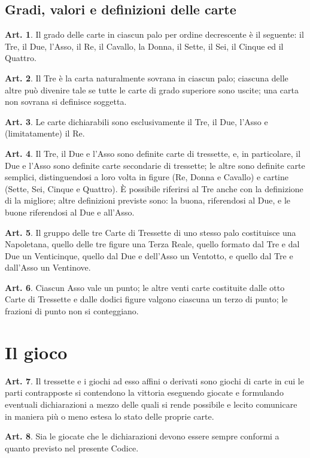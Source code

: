 \documentclass[italian,a4paper]{book}
\theoremstyle{definition}
\newtheorem{art}{Art.}
\begin{document}
\subsection{Gradi, valori e definizioni delle carte}
\begin{art}
    Il grado delle carte in ciascun palo per ordine decrescente è il seguente: il Tre, il Due, l'Asso, il Re, il Cavallo, la Donna, il Sette, il Sei, il Cinque ed il Quattro.
\end{art}
\begin{art}\label{carta.sovrana}
    Il Tre è la carta naturalmente sovrana in ciascun palo; ciascuna delle altre può divenire tale se tutte le carte di grado superiore sono uscite; una carta non sovrana si definisce soggetta. 
\end{art}
\begin{art}
    Le carte dichiarabili sono esclusivamente il Tre, il Due, l'Asso e (limitatamente) il Re.
\end{art}
\begin{art}
    Il Tre, il Due e l'Asso sono definite carte di tressette, e, in particolare, il Due e l'Asso sono definite carte secondarie di tressette; le altre sono definite carte semplici, distinguendosi a loro volta in figure (Re, Donna e Cavallo) e cartine (Sette, Sei, Cinque e Quattro). \`E possibile riferirsi al Tre anche con la definizione di la migliore; altre definizioni previste sono: la buona, riferendosi al Due, e le buone riferendosi al Due e all'Asso.
\end{art}
\begin{art}
    Il gruppo delle tre Carte di Tressette di uno stesso palo costituisce una Napoletana, quello delle tre figure una Terza Reale, quello formato dal Tre e dal Due un Venticinque, quello dal Due e dell'Asso un Ventotto, e quello dal Tre e dall'Asso un Ventinove.
\end{art}
\begin{art}
    Ciascun Asso vale un punto; le altre venti carte costituite dalle otto Carte di Tressette e dalle dodici figure valgono ciascuna un terzo di punto; le frazioni di punto non si conteggiano.
\end{art}
\section{Il gioco}
\begin{art}
    Il tressette e i giochi ad esso affini o derivati sono giochi di carte in cui le parti contrapposte si contendono la vittoria eseguendo giocate e formulando eventuali dichiarazioni a mezzo delle quali si rende possibile e lecito comunicare in maniera più o meno estesa lo stato delle proprie carte.
\end{art}
\begin{art}
    Sia le giocate che le dichiarazioni devono essere sempre conformi a quanto previsto nel presente Codice.
\end{art}
\end{document}
